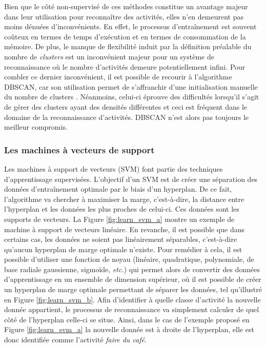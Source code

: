 Bien que le côté non-supervisé de ces méthodes constitue un avantage majeur dans leur utilisation pour reconnaître des activités, elles n'en demeurent pas moins dénuées d'inconvénients. En effet, le processus d'entraînement est souvent coûteux en termes de temps d'exécution et en termes de consommation de la mémoire. De plus, le manque de flexibilité induit par la définition préalable du nombre de \textit{clusters} est un inconvénient majeur pour un système de reconnaissance où le nombre d'activités demeure potentiellement infini. Pour combler ce dernier inconvénient, il est possible de recourir à l'algorithme \ac{DBSCAN}, car son utilisation permet de s'affranchir d'une initialisation manuelle du nombre de clusters \citep{Gan2015}. Néanmoins, celui-ci éprouve des difficultés lorsqu'il s'agit de gérer des clusters ayant des densités différentes et ceci est fréquent dans le domaine de la reconnaissance d'activités. \acs{DBSCAN} n'est alors pas toujours le meilleur compromis.

\subsubsection{Les machines à vecteurs de support}

Les machines à support de vecteurs (\ac{SVM}) font partie des techniques d'apprentissage supervisées. L'objectif d'un \acs{SVM} est de créer une séparation des données d'entraînement optimale par le biais d'un hyperplan. De ce fait, l'algorithme va chercher à maximiser la marge, c'est-à-dire, la distance entre l'hyperplan et les données les plus proches de celui-ci. Ces données sont les supports de vecteurs. La Figure \ref{fig:learn_svm_a} montre un exemple de machine à support de vecteurs linéaire. En revanche, il est possible que dans certains cas, les données ne soient pas linéairement séparables, c'est-à-dire qu'aucun hyperplan de marge optimale n'existe. Pour remédier à cela, il est possible d'utiliser une fonction de noyau (linéaire, quadratique, polynomiale, de base radiale gaussienne, sigmoïde, \textit{etc.}) qui permet alors de convertir des données d'apprentissage en un ensemble de dimension supérieur, où il est possible de créer un hyperplan de marge optimale permettant de séparer les données, tel qu'illustré en Figure \ref{fig:learn_svm_b}. Afin d'identifier à quelle classe d'activité la nouvelle donnée appartient, le processus de reconnaissance va simplement calculer de quel côté de l'hyperplan celle-ci se situe. Ainsi, dans le cas de l'exemple proposé en Figure \ref{fig:learn_svm_a} la nouvelle donnée est à droite de l'hyperplan, elle est donc identifiée comme l'activité \og \textit{faire du café}\fg.

